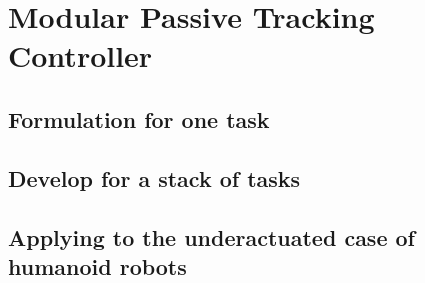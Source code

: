 \documentclass[main.tex]{subfiles}
\begin{document}
\section{Modular Passive Tracking Controller}\label{sec:MPTC}
\subsection{Formulation for one task}
\subsection{Develop for a stack of tasks}
\subsection{Applying to the underactuated case of humanoid robots}
\end{document}
